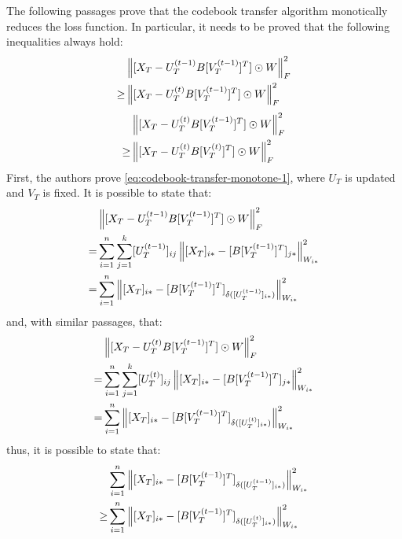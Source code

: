 \vskip 0.7cm
The following passages prove that the codebook transfer algorithm monotically reduces the loss function. In particular, it needs to be proved that the following inequalities always hold:
\begin{equation}
\label{eq:codebook-transfer-monotone-1}
\begin{split}
& \left\lVert[X_T - U_T^{(t - 1)} B [V_T^{(t - 1)}]^T] \odot W\right\rVert_F^2 \\
\geq & \left\lVert[X_T - U_T^{(t)} B [V_T^{(t - 1)}]^T] \odot W\right\rVert_F^2
\end{split}
\end{equation}
\begin{equation}
\label{eq:codebook-transfer-monotone-2}
\begin{split}
& \left\lVert[X_T - U_T^{(t)} B [V_T^{(t - 1)}]^T] \odot W\right\rVert_F^2 \\
\geq & \left\lVert[X_T - U_T^{(t)} B [V_T^{(t)}]^T] \odot W\right\rVert_F^2
\end{split}
\end{equation}
First, the authors prove \autoref{eq:codebook-transfer-monotone-1}, where $U_T$ is updated and $V_T$ is fixed. It is possible to state that:
\begin{equation}
\label{eq:codebook-transfer-monotone-3}
\begin{split}
& \left\lVert[X_T - U_T^{(t - 1)} B [V_T^{(t - 1)}]^T] \odot W\right\rVert_F^2 \\
= & \sum_{i = 1}^{n} \sum_{j = 1}^{k} [U_T^{(t - 1)}]_{ij} \left\lVert[X_T]_{i*} - [B [V_T^{(t - 1)}]^T]_{j*}\right\rVert_{W_{i*}}^2 \\
= & \sum_{i = 1}^{n} \left\lVert[X_T]_{i*} - [B [V_T^{(t - 1)}]^T]_{\delta([U_T^{(t - 1)}]_{i*})}\right\rVert_{W_{i*}}^2
\end{split}
\end{equation}
and, with similar passages, that:
\begin{equation}
\begin{split}
& \left\lVert[X_T - U_T^{(t)} B [V_T^{(t - 1)}]^T] \odot W\right\rVert_F^2 \\
= & \sum_{i = 1}^{n} \sum_{j = 1}^{k} [U_T^{(t)}]_{ij} \left\lVert[X_T]_{i*} - [B [V_T^{(t - 1)}]^T]_{j*}\right\rVert_{W_{i*}}^2 \\
= & \sum_{i = 1}^{n} \left\lVert[X_T]_{i*} - [B [V_T^{(t - 1)}]^T]_{\delta([U_T^{(t)}]_{i*})}\right\rVert_{W_{i*}}^2
\end{split}
\end{equation}
thus, it is possible to state that:
\begin{equation}
\begin{split}
& \sum_{i = 1}^{n} \left\lVert[X_T]_{i*} - [B [V_T^{(t - 1)}]^T]_{\delta([U_T^{(t - 1)}]_{i*})}\right\rVert_{W_{i*}}^2 \\
\geq & \sum_{i = 1}^{n} \left\lVert[X_T]_{i*} - [B [V_T^{(t - 1)}]^T]_{\delta([U_T^{(t)}]_{i*})}\right\rVert_{W_{i*}}^2
\end{split}
\end{equation}

